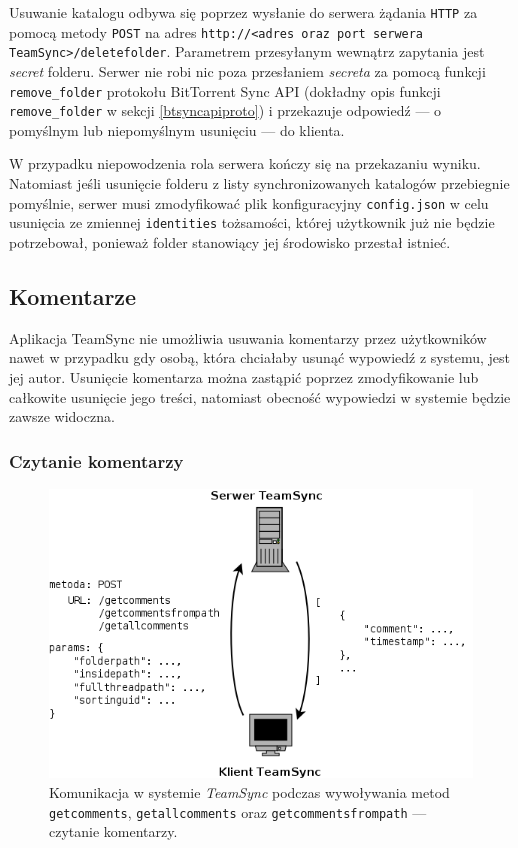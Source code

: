 Usuwanie katalogu odbywa się poprzez wysłanie do serwera żądania \texttt{HTTP} za pomocą metody \texttt{POST} na adres \texttt{http://<adres oraz port serwera TeamSync>\-/deletefolder}. Parametrem przesyłanym wewnątrz zapytania jest \emph{secret} folderu. Serwer nie robi nic poza przesłaniem \emph{secreta} za pomocą funkcji \texttt{remove\_folder} protokołu BitTorrent Sync API (dokładny opis funkcji \texttt{remove\_folder} w sekcji \ref{btsyncapiproto}) i  przekazuje odpowiedź --- o pomyślnym lub niepomyślnym usunięciu --- do klienta.

W przypadku niepowodzenia rola serwera kończy się na przekazaniu wyniku. Natomiast jeśli usunięcie folderu z listy synchronizowanych katalogów przebiegnie pomyślnie, serwer musi zmodyfikować plik konfiguracyjny \texttt{config.json} w celu usunięcia ze zmiennej \texttt{identities} tożsamości, której użytkownik już nie będzie potrzebował, ponieważ folder stanowiący jej środowisko przestał istnieć.

\subsection{Komentarze}

\label{comments}

Aplikacja TeamSync nie umożliwia usuwania komentarzy przez użytkowników nawet w przypadku gdy osobą, która chciałaby usunąć wypowiedź z systemu, jest jej autor. Usunięcie komentarza można zastąpić poprzez zmodyfikowanie lub całkowite usunięcie jego treści, natomiast obecność wypowiedzi w systemie będzie zawsze widoczna.

\subsubsection*{Czytanie komentarzy}

\begin{figure}[h!]
  \vspace{5pt}
  \begin{center}
    \includegraphics[width=320pt]{figures/metgetcomments.png}
  \end{center}
  \caption{Komunikacja w systemie \emph{TeamSync} podczas wywoływania metod \texttt{getcomments}, \texttt{getallcomments} oraz \texttt{getcommentsfrompath} --- czytanie komentarzy.}
  \label{picmetdeletefolder}
\end{figure}

